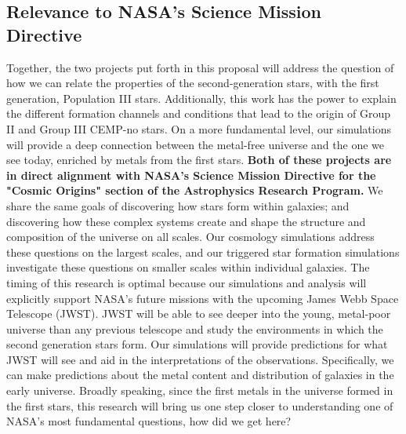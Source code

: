 \documentclass[letterpaper, 12pt]{article}
\begin{document}
\subsection{Relevance to NASA's Science Mission Directive}
Together, the two projects put forth in this proposal will address the question of how we can relate the properties of the second-generation stars, with the first generation, Population III stars. Additionally, this work has the power to explain the different formation channels and conditions that lead to the origin of Group II and Group III CEMP-no stars. On a more fundamental level, our simulations will provide a deep connection between the metal-free universe and the one we see today, enriched by metals from the first stars. \textbf{Both of these projects are in direct alignment with NASA's Science Mission Directive for the "Cosmic Origins" section of the Astrophysics Research Program.} We share the same goals of discovering how stars form within galaxies; and discovering how these complex systems create and shape the structure and composition of the universe on all scales. Our cosmology simulations address these questions on the largest scales, and our triggered star formation simulations investigate these questions on smaller scales within individual galaxies. The timing of this research is optimal because our simulations and analysis will explicitly support NASA's future missions with the upcoming James Webb Space Telescope (JWST). JWST will be able to see deeper into the young, metal-poor universe than any previous telescope and study the environments in which the second generation stars form. Our simulations will provide predictions for what JWST will see and aid in the interpretations of the observations. Specifically, we can make predictions about the metal content and distribution of galaxies in the early universe. Broadly speaking, since the first metals in the universe formed in the first stars, this research will bring us one step closer to understanding one of NASA's most fundamental questions, how did we get here?


\end{document}
